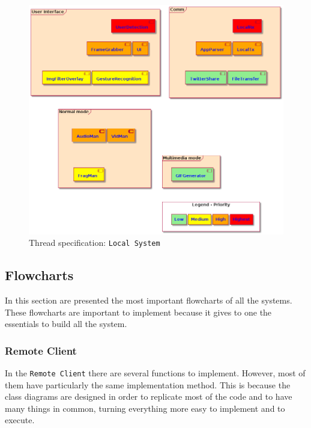 %
\begin{figure}[htb!]
\centering
    \includegraphics[width=0.8\columnwidth]{./img/thread-spec-local.png}
  \caption{Thread specification: \texttt{Local System}}%
\label{fig:thread-spec-local}
\end{figure}
%

\subsection{Flowcharts}
\label{sec:flowcharts}

In this section are presented the most important flowcharts of all the systems. 
These flowcharts are important to implement because it gives to one the essentials to build all the system.

\subsubsection{Remote Client}
\label{sec:rc-flowcharts}

In the \texttt{Remote Client} there are several functions to implement.
However, most of them have particularly the same implementation method.
This is because the class diagrams are designed in order to replicate most of the code and to have many things in common, turning everything more easy to implement and to execute.

